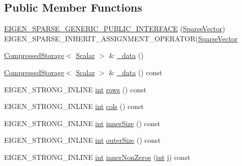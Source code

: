 \subsection*{Public Member Functions}
\begin{DoxyCompactItemize}
\item 
\hyperlink{class_sparse_vector_a252f4ebb3b09e2ef569f1a5d8747d8d3}{E\-I\-G\-E\-N\-\_\-\-S\-P\-A\-R\-S\-E\-\_\-\-G\-E\-N\-E\-R\-I\-C\-\_\-\-P\-U\-B\-L\-I\-C\-\_\-\-I\-N\-T\-E\-R\-F\-A\-C\-E} (\hyperlink{class_sparse_vector}{Sparse\-Vector}) E\-I\-G\-E\-N\-\_\-\-S\-P\-A\-R\-S\-E\-\_\-\-I\-N\-H\-E\-R\-I\-T\-\_\-\-A\-S\-S\-I\-G\-N\-M\-E\-N\-T\-\_\-\-O\-P\-E\-R\-A\-T\-O\-R(\hyperlink{class_sparse_vector}{Sparse\-Vector}
\item 
\hyperlink{class_compressed_storage}{Compressed\-Storage}$<$ \hyperlink{class_sparse_matrix_base_af39d70f2b7e775e9e17b666cd24128c8}{Scalar} $>$ \& \hyperlink{class_sparse_vector_a6bde71c66664b7e902cf09b3c51671ee}{\-\_\-data} ()
\item 
\hyperlink{class_compressed_storage}{Compressed\-Storage}$<$ \hyperlink{class_sparse_matrix_base_af39d70f2b7e775e9e17b666cd24128c8}{Scalar} $>$ \& \hyperlink{class_sparse_vector_ac1aac0eedec39adad406552b2109e2d0}{\-\_\-data} () const 
\item 
E\-I\-G\-E\-N\-\_\-\-S\-T\-R\-O\-N\-G\-\_\-\-I\-N\-L\-I\-N\-E \hyperlink{ioapi_8h_a787fa3cf048117ba7123753c1e74fcd6}{int} \hyperlink{class_sparse_vector_a56b354dffd1a51cb0d896f66f1160fe3}{rows} () const 
\item 
E\-I\-G\-E\-N\-\_\-\-S\-T\-R\-O\-N\-G\-\_\-\-I\-N\-L\-I\-N\-E \hyperlink{ioapi_8h_a787fa3cf048117ba7123753c1e74fcd6}{int} \hyperlink{class_sparse_vector_ac1a576a10b7ba8d64453dd015502a4ad}{cols} () const 
\item 
E\-I\-G\-E\-N\-\_\-\-S\-T\-R\-O\-N\-G\-\_\-\-I\-N\-L\-I\-N\-E \hyperlink{ioapi_8h_a787fa3cf048117ba7123753c1e74fcd6}{int} \hyperlink{class_sparse_vector_abe5aab30e15fbecc60c276f50be850ee}{inner\-Size} () const 
\item 
E\-I\-G\-E\-N\-\_\-\-S\-T\-R\-O\-N\-G\-\_\-\-I\-N\-L\-I\-N\-E \hyperlink{ioapi_8h_a787fa3cf048117ba7123753c1e74fcd6}{int} \hyperlink{class_sparse_vector_aa7f90d1222b6601645d8122680777d7d}{outer\-Size} () const 
\item 
E\-I\-G\-E\-N\-\_\-\-S\-T\-R\-O\-N\-G\-\_\-\-I\-N\-L\-I\-N\-E \hyperlink{ioapi_8h_a787fa3cf048117ba7123753c1e74fcd6}{int} \hyperlink{class_sparse_vector_a6008e0f4f07816edf27500a6ec407031}{inner\-Non\-Zeros} (\hyperlink{ioapi_8h_a787fa3cf048117ba7123753c1e74fcd6}{int} j) const 

\end{DoxyCompactItemize}
